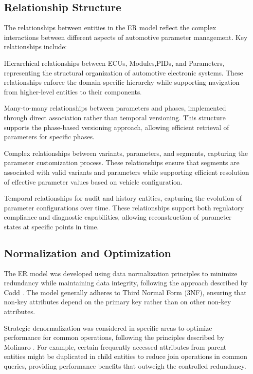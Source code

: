 \subsection{Relationship Structure}
\label{subsec:relationship-structure}

The relationships between entities in the ER model reflect the complex interactions between different aspects of automotive parameter management. Key relationships include:

Hierarchical relationships between \acp{ECU}, Modules,\acp{PID}, and Parameters, representing the structural organization of automotive electronic systems. These relationships enforce the domain-specific hierarchy while supporting navigation from higher-level entities to their components.

Many-to-many relationships between parameters and phases, implemented through direct association rather than temporal versioning. This structure supports the phase-based versioning approach, allowing efficient retrieval of parameters for specific phases.

Complex relationships between variants, parameters, and segments, capturing the parameter customization process. These relationships ensure that segments are associated with valid variants and parameters while supporting efficient resolution of effective parameter values based on vehicle configuration.

Temporal relationships for audit and history entities, capturing the evolution of parameter configurations over time. These relationships support both regulatory compliance and diagnostic capabilities, allowing reconstruction of parameter states at specific points in time.

\subsection{Normalization and Optimization}
\label{subsec:normalization-optimization}

The ER model was developed using data normalization principles to minimize redundancy while maintaining data integrity, following the approach described by Codd \cite{codd1970relational}. The model generally adheres to Third Normal Form (3NF), ensuring that non-key attributes depend on the primary key rather than on other non-key attributes.

Strategic denormalization was considered in specific areas to optimize performance for common operations, following the principles described by Molinaro \cite{molinaro2005sql}. For example, certain frequently accessed attributes from parent entities might be duplicated in child entities to reduce join operations in common queries, providing performance benefits that outweigh the controlled redundancy.


